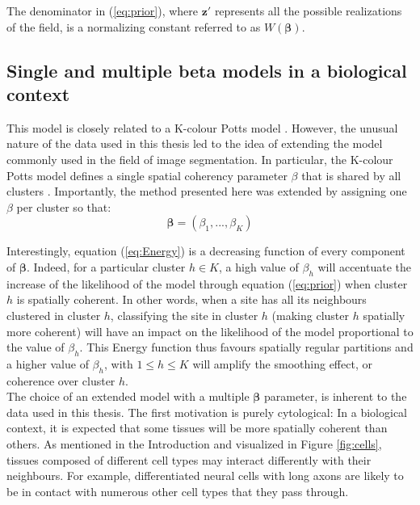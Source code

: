 The denominator in (\ref{eq:prior}), where $\boldsymbol{z'}$ represents all the possible realizations of the field, is a normalizing constant referred to as $W(\boldsymbol{\beta})$.\\

	\subsection{Single and multiple beta models in a biological context}
This model is closely related to a K-colour Potts model \citep{Wu82}. However, the unusual nature of the data used in this thesis led to the idea of extending the model commonly used in the field of image segmentation. In particular, the K-colour Potts model defines a single spatial coherency parameter $\beta$ that is shared by all clusters \citep{subudhi14,zhang14}. Importantly, the method presented here was extended by assigning one $\beta$ per cluster so that:
\begin{equation*}
\label{eq:beta}
\boldsymbol{\beta} = (\beta_{1},...,\beta_{K})
\end{equation*}

 Interestingly, equation (\ref{eq:Energy}) is a decreasing function of every component of $\boldsymbol{\beta}$. Indeed, for a particular cluster $h \in K$, a high value of $\beta_h$ will accentuate the increase of the likelihood of the model through equation (\ref{eq:prior}) when cluster $h$ is spatially coherent. In other words, when a site has all its neighbours clustered in cluster $h$, classifying the site in cluster $h$ (making cluster $h$ spatially more coherent) will have an impact on the likelihood of the model proportional to the value of $\beta_h$. This Energy function thus favours spatially regular partitions and a higher value of $\beta_h$, with $1 \leq h \leq K $ will amplify the smoothing effect, or coherence over cluster $h$.\\
 
 The choice of an extended model with a multiple $\boldsymbol{\beta}$ parameter, is inherent to the data used in this thesis. The first motivation is purely cytological: In a biological context, it is expected that some tissues will be more spatially coherent than others. As mentioned in the Introduction and visualized in Figure \ref{fig:cells}, tissues composed of different cell types may interact differently with their neighbours. For example, differentiated neural cells with long axons are likely to be in contact with numerous other cell types that they pass through.\\
 
